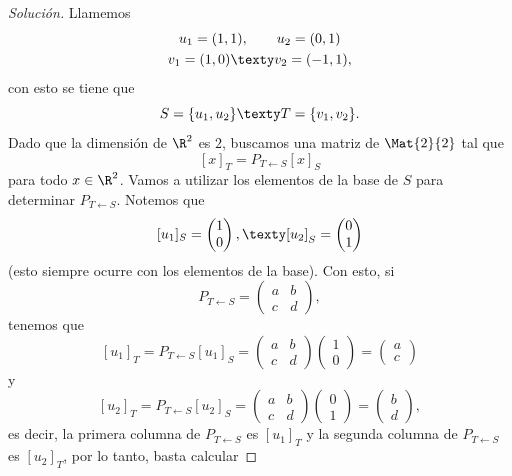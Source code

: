 \documentclass[a4,11pt]{aleph-notas}
\begin{document}
\begin{proof}[Solución]
    Llamemos
    \begin{gather*}
        u_1 = (1,1),\qquad
        u_2 = (0,1)\\
        v_1 = (1,0)\texty
        v_2 = (-1,1),
    \end{gather*}
    con esto se tiene que
    \[
        S = \{u_1,u_2\}
        \texty
        T = \{v_1,v_2\}.
    \]
    Dado que la dimensión de $\R^2$ es $2$, buscamos una matriz de $\Mat{2}{2}$ tal que
    \[
        [x]_T = P_{T \leftarrow S} [x]_S
    \]
    para todo $x\in \R^2$. Vamos a utilizar los elementos de la base de $S$ para determinar $P_{T \leftarrow S}$. Notemos que
    \[
        [u_1]_S = \begin{pmatrix} 1\\ 0  \end{pmatrix},
        \texty
        [u_2]_S = \begin{pmatrix} 0\\ 1  \end{pmatrix}
    \]
    (esto siempre ocurre con los elementos de la base). Con esto, si
    \[
        P_{T \leftarrow S} = 
        \begin{pmatrix}a & b \\ c & d \end{pmatrix},
    \]
    tenemos que
    \[
        [u_1]_T = P_{T \leftarrow S} [u_1]_S
        =\begin{pmatrix}a & b \\ c & d \end{pmatrix} 
        \begin{pmatrix} 1\\ 0  \end{pmatrix}
        = \begin{pmatrix} a\\ c  \end{pmatrix}
    \]
    y
    \[
        [u_2]_T = P_{T \leftarrow S} [u_2]_S
        =\begin{pmatrix}a & b \\ c & d \end{pmatrix} 
        \begin{pmatrix} 0\\ 1  \end{pmatrix}
        = \begin{pmatrix} b\\ d  \end{pmatrix},
    \]
    es decir, la primera columna de $P_{T \leftarrow S}$ es $[u_1]_T$ y la segunda columna de $P_{T \leftarrow S}$ es $[u_2]_T$, por lo tanto, basta calcular

\end{proof}
\end{document}
